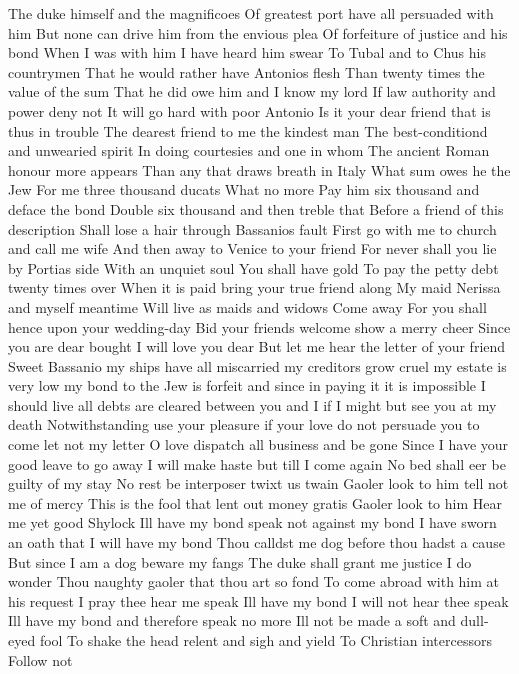 The duke himself and the magnificoes
Of greatest port have all persuaded with him
But none can drive him from the envious plea
Of forfeiture of justice and his bond
When I was with him I have heard him swear
To Tubal and to Chus his countrymen
That he would rather have Antonios flesh
Than twenty times the value of the sum
That he did owe him and I know my lord
If law authority and power deny not
It will go hard with poor Antonio
Is it your dear friend that is thus in trouble
The dearest friend to me the kindest man
The best-conditiond and unwearied spirit
In doing courtesies and one in whom
The ancient Roman honour more appears
Than any that draws breath in Italy
What sum owes he the Jew
For me three thousand ducats
What no more
Pay him six thousand and deface the bond
Double six thousand and then treble that
Before a friend of this description
Shall lose a hair through Bassanios fault
First go with me to church and call me wife
And then away to Venice to your friend
For never shall you lie by Portias side
With an unquiet soul You shall have gold
To pay the petty debt twenty times over
When it is paid bring your true friend along
My maid Nerissa and myself meantime
Will live as maids and widows Come away
For you shall hence upon your wedding-day
Bid your friends welcome show a merry cheer
Since you are dear bought I will love you dear
But let me hear the letter of your friend
Sweet Bassanio my ships have all
miscarried my creditors grow cruel my estate is
very low my bond to the Jew is forfeit and since
in paying it it is impossible I should live all
debts are cleared between you and I if I might but
see you at my death Notwithstanding use your
pleasure if your love do not persuade you to come
let not my letter
O love dispatch all business and be gone
Since I have your good leave to go away
I will make haste but till I come again
No bed shall eer be guilty of my stay
No rest be interposer twixt us twain
Gaoler look to him tell not me of mercy
This is the fool that lent out money gratis
Gaoler look to him
Hear me yet good Shylock
Ill have my bond speak not against my bond
I have sworn an oath that I will have my bond
Thou calldst me dog before thou hadst a cause
But since I am a dog beware my fangs
The duke shall grant me justice I do wonder
Thou naughty gaoler that thou art so fond
To come abroad with him at his request
I pray thee hear me speak
Ill have my bond I will not hear thee speak
Ill have my bond and therefore speak no more
Ill not be made a soft and dull-eyed fool
To shake the head relent and sigh and yield
To Christian intercessors Follow not

